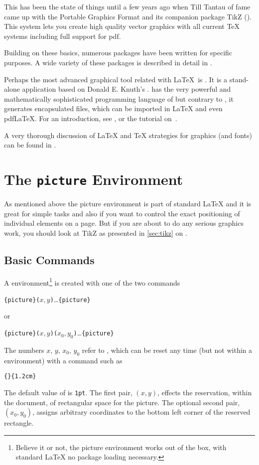 This has been the state of things until a few years ago when Till Tantau of
 fame came up with the Portable Graphics Format  and its
companion package TikZ (). This system lets you create high
quality vector graphics with all current \TeX{} systems including full
support for pdf.

Building on these basics, numerous packages have been written for specific
purposes. A wide variety of these packages is described in detail in
\graphicscompanion{}.

Perhaps the most advanced graphical tool related with \LaTeX\ is . It is a stand-alone application
based on Donald E. Knuth's .  has the very powerful and
mathematically sophisticated programming language of  but contrary to ,
it generates encapsulated \PSi{} files,
which can be imported in \LaTeX{} and even pdf\LaTeX{}. For an introduction, see \hobby, or the tutorial on~\cite{ursoswald}.

A very thorough discussion of \LaTeX{} and \TeX{} strategies for graphics (and fonts) can
be found in \hoenig.

\section{The \texttt{picture} Environment}

As mentioned above the picture environment is part of standard \LaTeX{} and it is great for simple tasks and also if you want
to control the exact positioning of individual elements on a page. But if you are about to do any serious graphics work, you should
look at TikZ as presented in \autoref{sec:tikz} on .

\subsection{Basic Commands}

A  environment\footnote{Believe it or not, the picture environment works out of the
  box, with standard \LaTeX{} no package loading necessary.} is created with one of the two commands
\begin{lscommand}
  \verb|{picture}(|$x,y$\verb|)|\ldots{}\verb|{picture}|
\end{lscommand}
\noindent or
\begin{lscommand}
  \verb|{picture}(|$x,y$\verb|)(|$x_0,y_0$\verb|)|\ldots{}\verb|{picture}|
\end{lscommand}
The numbers $x,\,y,\,x_0,\,y_0$ refer to , which can be reset any time
(but not within a  environment) with a command such as
\begin{lscommand}
  \verb|{|\verb|}{1.2cm}|
\end{lscommand}
The default value of  is \texttt{1pt}. The first pair, $(x,y)$, effects
the reservation, within the document, of rectangular space for the picture. The optional
second pair, $(x_0,y_0)$, assigns arbitrary coordinates to the bottom left corner of the
reserved rectangle.

